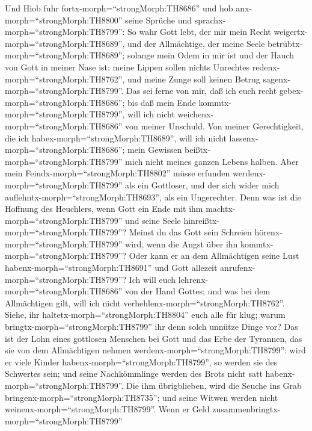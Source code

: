  Und Hiob fuhr fortx-morph=``strongMorph:TH8686'' und hob
anx-morph=``strongMorph:TH8800'' seine Sprüche und
sprachx-morph=``strongMorph:TH8799'':  So wahr Gott lebt,
der mir mein Recht weigertx-morph=``strongMorph:TH8689'', und der
Allmächtige, der meine Seele betrübtx-morph=``strongMorph:TH8689'';
 solange mein Odem in mir ist und der Hauch von Gott in
meiner Nase ist:  meine Lippen sollen nichts Unrechtes
redenx-morph=``strongMorph:TH8762'', und meine Zunge soll keinen Betrug
sagenx-morph=``strongMorph:TH8799''.  Das sei ferne von mir,
daß ich euch recht gebex-morph=``strongMorph:TH8686''; bis daß mein Ende
kommtx-morph=``strongMorph:TH8799'', will ich nicht
weichenx-morph=``strongMorph:TH8686'' von meiner Unschuld. 
Von meiner Gerechtigkeit, die ich habex-morph=``strongMorph:TH8689'',
will ich nicht lassenx-morph=``strongMorph:TH8686''; mein Gewissen
beißtx-morph=``strongMorph:TH8799'' mich nicht meines ganzen Lebens
halben.  Aber mein Feindx-morph=``strongMorph:TH8802'' müsse
erfunden werdenx-morph=``strongMorph:TH8799'' als ein Gottloser, und der
sich wider mich auflehntx-morph=``strongMorph:TH8693'', als ein
Ungerechter.  Denn was ist die Hoffnung des Heuchlers, wenn
Gott ein Ende mit ihm machtx-morph=``strongMorph:TH8799'' und seine
Seele hinreißtx-morph=``strongMorph:TH8799''?  Meinst du das
Gott sein Schreien hörenx-morph=``strongMorph:TH8799'' wird, wenn die
Angst über ihn kommtx-morph=``strongMorph:TH8799''?  Oder
kann er an dem Allmächtigen seine Lust
habenx-morph=``strongMorph:TH8691'' und Gott allezeit
anrufenx-morph=``strongMorph:TH8799''?  Ich will euch
lehrenx-morph=``strongMorph:TH8686'' von der Hand Gottes; und was bei
dem Allmächtigen gilt, will ich nicht
verhehlenx-morph=``strongMorph:TH8762''.  Siehe, ihr
haltetx-morph=``strongMorph:TH8804'' euch alle für klug; warum
bringtx-morph=``strongMorph:TH8799'' ihr denn solch unnütze Dinge vor?
 Das ist der Lohn eines gottlosen Menschen bei Gott und das
Erbe der Tyrannen, das sie von dem Allmächtigen nehmen
werdenx-morph=``strongMorph:TH8799'':  wird er viele Kinder
habenx-morph=``strongMorph:TH8799'', so werden sie des Schwertes sein;
und seine Nachkömmlinge werden des Brots nicht satt
habenx-morph=``strongMorph:TH8799''.  Die ihm übrigblieben,
wird die Seuche ins Grab bringenx-morph=``strongMorph:TH8735''; und
seine Witwen werden nicht weinenx-morph=``strongMorph:TH8799''.
 Wenn er Geld zusammenbringtx-morph=``strongMorph:TH8799''

